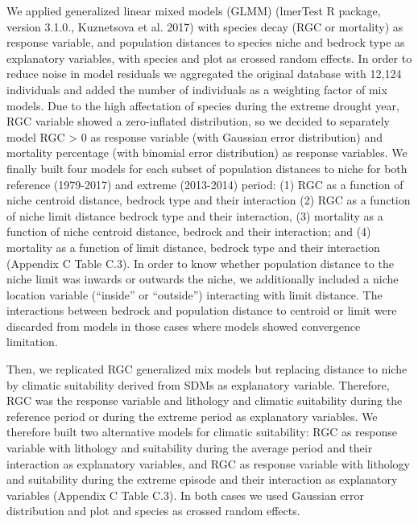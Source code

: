 \documentclass[11pt,twoside]{reedthesis}
\begin{document}
We applied generalized linear mixed models (GLMM) (lmerTest R package,
version 3.1.0., Kuznetsova et al. 2017) with species decay (RGC or
mortality) as response variable, and population distances to species
niche and bedrock type as explanatory variables, with species and plot
as crossed random effects. In order to reduce noise in model residuals
we aggregated the original database with 12,124 individuals and added
the number of individuals as a weighting factor of mix models. Due to
the high affectation of species during the extreme drought year, RGC
variable showed a zero-inflated distribution, so we decided to
separately model RGC \textgreater{} 0 as response variable (with
Gaussian error distribution) and mortality percentage (with binomial
error distribution) as response variables. We finally built four models
for each subset of population distances to niche for both reference
(1979-2017) and extreme (2013-2014) period: (1) RGC as a function of
niche centroid distance, bedrock type and their interaction (2) RGC as a
function of niche limit distance bedrock type and their interaction, (3)
mortality as a function of niche centroid distance, bedrock and their
interaction; and (4) mortality as a function of limit distance, bedrock
type and their interaction (Appendix C Table C.3). In order to know
whether population distance to the niche limit was inwards or outwards
the niche, we additionally included a niche location variable
(``inside'' or ``outside'') interacting with limit distance. The
interactions between bedrock and population distance to centroid or
limit were discarded from models in those cases where models showed
convergence limitation.\par

Then, we replicated RGC generalized mix models but replacing distance to
niche by climatic suitability derived from SDMs as explanatory variable.
Therefore, RGC was the response variable and lithology and climatic
suitability during the reference period or during the extreme period as
explanatory variables. We therefore built two alternative models for
climatic suitability: RGC as response variable with lithology and
suitability during the average period and their interaction as
explanatory variables, and RGC as response variable with lithology and
suitability during the extreme episode and their interaction as
explanatory variables (Appendix C Table C.3). In both cases we used
Gaussian error distribution and plot and species as crossed random
effects.\par
\end{document}
